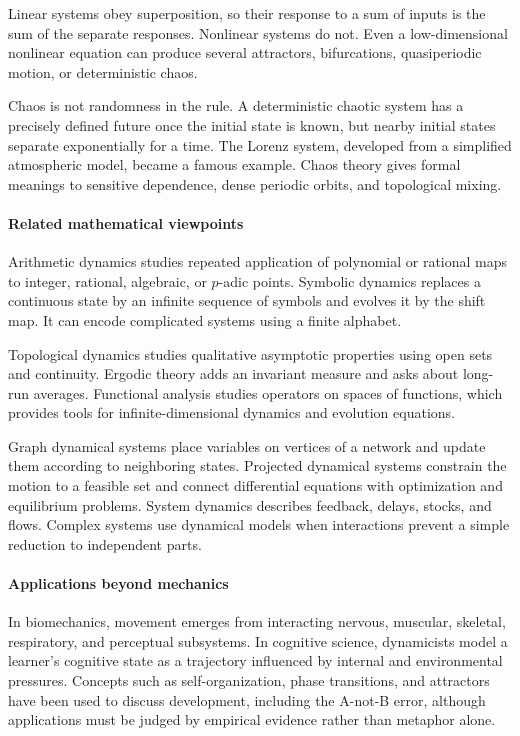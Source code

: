 Linear systems obey superposition, so their response to a sum of inputs is the sum of the separate responses. Nonlinear systems do not. Even a low-dimensional nonlinear equation can produce several attractors, bifurcations, quasiperiodic motion, or deterministic chaos.

Chaos is not randomness in the rule. A deterministic chaotic system has a precisely defined future once the initial state is known, but nearby initial states separate exponentially for a time. The Lorenz system, developed from a simplified atmospheric model, became a famous example. Chaos theory gives formal meanings to sensitive dependence, dense periodic orbits, and topological mixing.

\paragraph{Related mathematical viewpoints}

Arithmetic dynamics studies repeated application of polynomial or rational maps to integer, rational, algebraic, or $p$-adic points. Symbolic dynamics replaces a continuous state by an infinite sequence of symbols and evolves it by the shift map. It can encode complicated systems using a finite alphabet.

Topological dynamics studies qualitative asymptotic properties using open sets and continuity. Ergodic theory adds an invariant measure and asks about long-run averages. Functional analysis studies operators on spaces of functions, which provides tools for infinite-dimensional dynamics and evolution equations.

Graph dynamical systems place variables on vertices of a network and update them according to neighboring states. Projected dynamical systems constrain the motion to a feasible set and connect differential equations with optimization and equilibrium problems. System dynamics describes feedback, delays, stocks, and flows. Complex systems use dynamical models when interactions prevent a simple reduction to independent parts. \cite{dynamical_systems_theory_ref1,dynamical_systems_theory_ref4}

\paragraph{Applications beyond mechanics}

In biomechanics, movement emerges from interacting nervous, muscular, skeletal, respiratory, and perceptual subsystems. In cognitive science, dynamicists model a learner's cognitive state as a trajectory influenced by internal and environmental pressures. Concepts such as self-organization, phase transitions, and attractors have been used to discuss development, including the A-not-B error, although applications must be judged by empirical evidence rather than metaphor alone.

